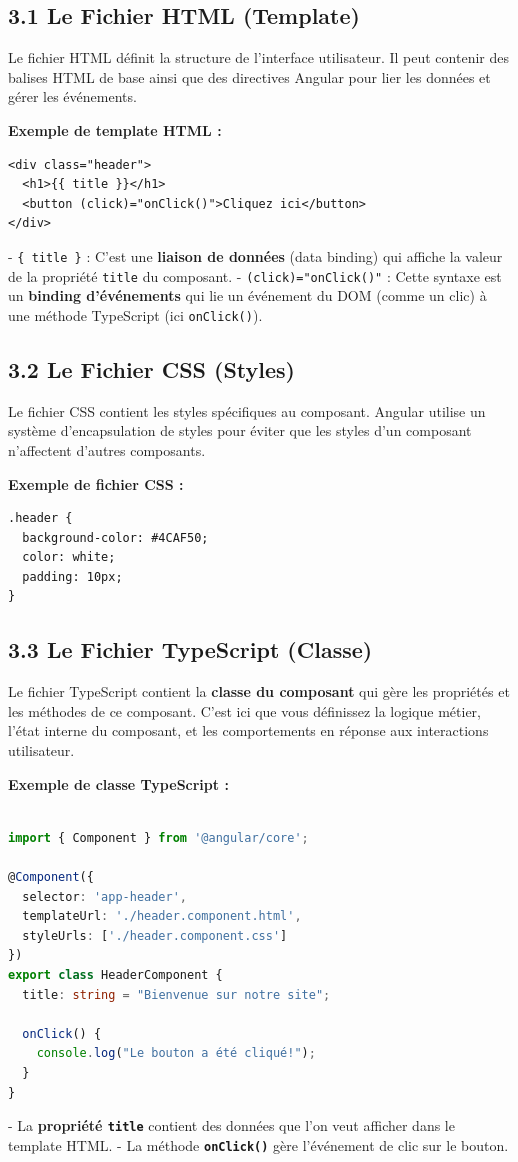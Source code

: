 \documentclass{article}
\begin{document}
\subsection*{3.1 Le Fichier HTML (Template)}

Le fichier HTML définit la structure de l'interface utilisateur. Il peut contenir des balises HTML de base ainsi que des directives Angular pour lier les données et gérer les événements.

\textbf{Exemple de template HTML :}
\begin{verbatim}
<div class="header">
  <h1>{{ title }}</h1>
  <button (click)="onClick()">Cliquez ici</button>
</div>
\end{verbatim}
- \texttt{{\{ title \}}} : C’est une \textbf{liaison de données} (data binding) qui affiche la valeur de la propriété \texttt{title} du composant.
- \texttt{(click)="onClick()"} : Cette syntaxe est un \textbf{binding d'événements} qui lie un événement du DOM (comme un clic) à une méthode TypeScript (ici \texttt{onClick()}). 

\subsection*{3.2 Le Fichier CSS (Styles)}

Le fichier CSS contient les styles spécifiques au composant. Angular utilise un système d'encapsulation de styles pour éviter que les styles d’un composant n'affectent d'autres composants.

\textbf{Exemple de fichier CSS :}
\begin{verbatim}
.header {
  background-color: #4CAF50;
  color: white;
  padding: 10px;
}
\end{verbatim}

\subsection*{3.3 Le Fichier TypeScript (Classe)}

Le fichier TypeScript contient la \textbf{classe du composant} qui gère les propriétés et les méthodes de ce composant. C’est ici que vous définissez la logique métier, l’état interne du composant, et les comportements en réponse aux interactions utilisateur.

\textbf{Exemple de classe TypeScript :}
\begin{lstlisting}[language=TypeScript, caption={Using a service in a component}, label={lst:typescript-service-usage}]

import { Component } from '@angular/core';

@Component({
  selector: 'app-header',
  templateUrl: './header.component.html',
  styleUrls: ['./header.component.css']
})
export class HeaderComponent {
  title: string = "Bienvenue sur notre site";

  onClick() {
    console.log("Le bouton a été cliqué!");
  }
}
\end{lstlisting}
- La \textbf{propriété \texttt{title}} contient des données que l’on veut afficher dans le template HTML.
- La méthode \textbf{\texttt{onClick()}} gère l'événement de clic sur le bouton.
\end{document}
